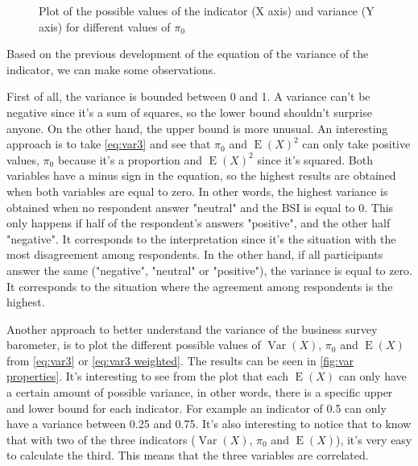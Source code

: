 \documentclass[12pt,a4paper,oneside]{book}
\DeclareMathOperator{\Var}{Var}
\DeclareMathOperator{\E}{E}
\begin{document}
\begin{figure}[hbt!]
    \caption{Plot of the possible values of the indicator (X axis) and variance (Y axis) for different values of $\pi_0$ }
    \label{fig:var properties}
\end{figure}


Based on the previous development of the equation of the variance of the indicator, we can make some observations.

First of all, the variance is bounded between 0 and 1. 
A variance can't be negative since it's a sum of squares, so the lower bound shouldn't surprise anyone. On the other hand, the upper bound is more unusual. 
An interesting approach is to take  \autoref{eq:var3} and see that $\pi_0$ and $\E(X)^2$ can only take positive values, $\pi_0$ because it's a proportion and $\E(X)^2$ since it's squared. 
Both variables have a minus sign in the equation, so the highest results are obtained when both variables are equal to zero.
In other words, the highest variance is obtained when no respondent answer "neutral" and the BSI is equal to 0. 
This only happens if half of the respondent's answers "positive", and the other half "negative".
It corresponds to the interpretation since it's the situation with the most disagreement among respondents.
In the other hand, if all participants answer the same ("negative", "neutral" or "positive"), the variance is equal to zero.
It corresponds to the situation where the agreement among respondents is the highest.

Another approach to better understand the variance of the business survey barometer, is to plot the different possible values of $\Var(X)$, $\pi_0$ and $\E(X)$ from \autoref{eq:var3} or \autoref{eq:var3 weighted}. The results can be seen in \autoref{fig:var properties}.
It's interesting to see from the plot that each $\E(X)$ can only have a certain amount of possible variance, in other words, there is a specific upper and lower bound for each indicator. For example an indicator of 0.5 can only have a variance between 0.25 and 0.75.
It's also interesting to notice that to know that with two of the three indicators ($\Var(X)$, $\pi_0$ and $\E(X)$), it's very easy to calculate the third. This means that the three variables are correlated.
\end{document}
